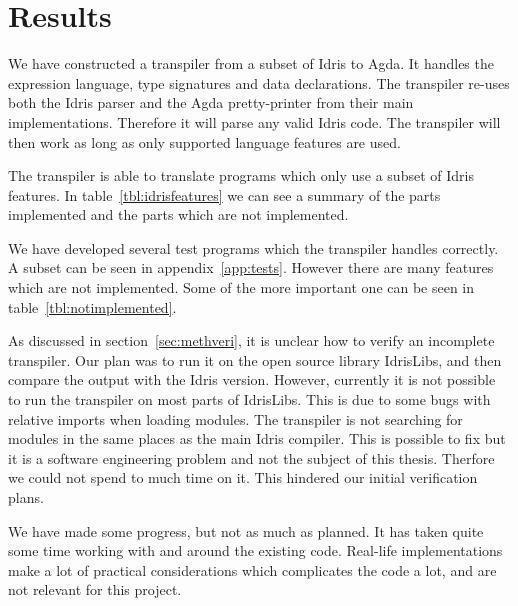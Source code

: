 \chapter{Results}



We have constructed a transpiler from a subset of Idris to Agda. It handles the
expression language, type signatures and data declarations.
The transpiler re-uses both the Idris parser and the Agda pretty-printer from
their main implementations. Therefore it will parse any valid Idris code. The
transpiler will then work as long as only supported language features are used.

The transpiler is able to translate programs which only use a subset of Idris
features. In table~\ref{tbl:idrisfeatures} we can see a summary of the parts
implemented and the parts which are not implemented.


We have developed several test programs which the transpiler handles correctly.
A subset can be seen in appendix~\ref{app:tests}. However there are many
features which are not implemented. Some of the more important one can be seen
in table~\ref{tbl:notimplemented}.

As discussed in section~\ref{sec:methveri}, it is unclear how to verify an
incomplete transpiler. Our plan was to run it on the open source library
IdrisLibs, and then compare the output with the Idris version.
However, currently it is not possible to run the transpiler on most parts of
IdrisLibs.  This is due to some bugs with relative imports when loading
modules. The transpiler is not searching for modules in the same places as the
main Idris compiler.
This is possible to fix but it is a software engineering
problem and not the subject of this thesis. Therfore we could not spend to much
time on it. This hindered our initial verification plans.

We have made some progress, but not as much as planned. It has taken quite some
time working with and around the existing code.  Real-life implementations make
a lot of practical considerations which complicates the code a lot, and are not
relevant for this project.

